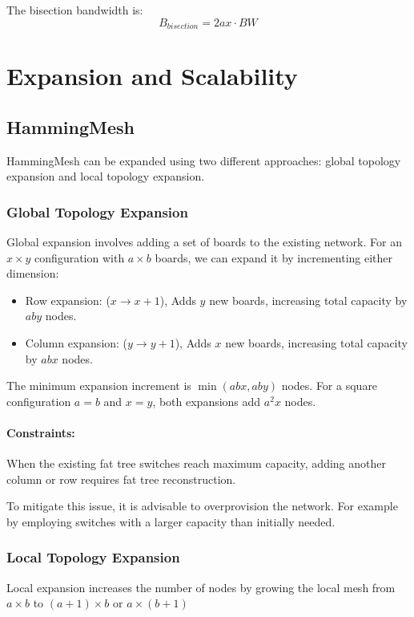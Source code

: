\documentclass{article}
\begin{document}
The bisection bandwidth is:
\[B_{bisection} = 2ax \cdot BW\]

\section{Expansion and Scalability}
\subsection{HammingMesh}
HammingMesh can be expanded using two different approaches: global topology expansion and local topology expansion.

\subsubsection{Global Topology Expansion}
Global expansion involves adding a set of boards to the existing network. For an $x \times y$ configuration with $a \times b$ boards, we can expand it by incrementing either dimension:

\begin{itemize}
    \item Row expansion: ($x \to x+1$), Adds $y$ new boards, increasing total capacity by $aby$ nodes.
    \item Column expansion: ($y \to y+1$), Adds $x$ new boards, increasing total capacity by $abx$ nodes.
\end{itemize}

The minimum expansion increment is $\min(abx, aby)$ nodes. For a square configuration $a = b$ and $x = y$, both expansions add $a^2x$ nodes.

\paragraph{Constraints:}

When the existing fat tree switches reach maximum capacity, adding another column or row requires fat tree reconstruction.

To mitigate this issue, it is advisable to overprovision the network. For example by employing switches with a larger capacity than initially needed.

\subsubsection{Local Topology Expansion}
Local expansion increases the number of nodes by growing the local mesh from $a \times b$ to $(a+1) \times b$ or $a \times (b+1)$
\end{document}

